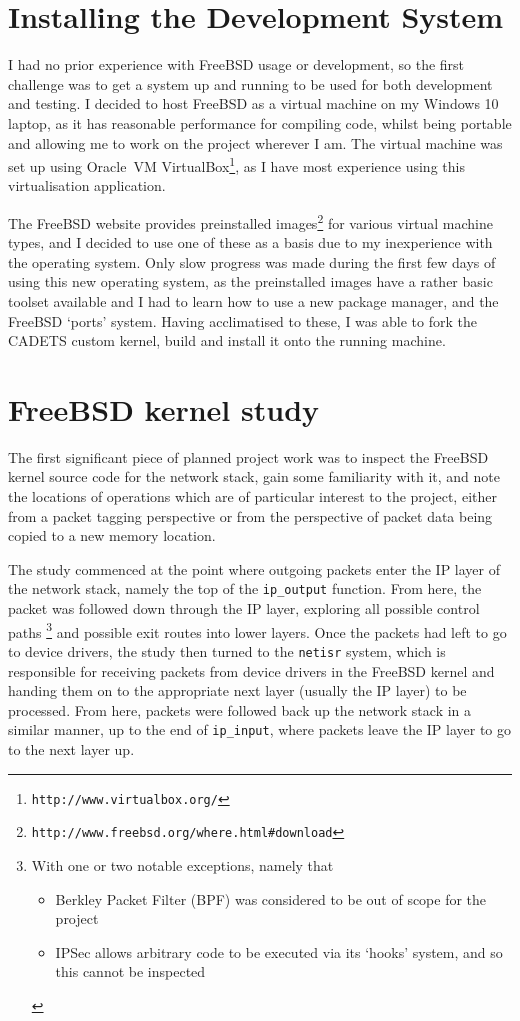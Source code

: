 \documentclass[a4paper,12pt,twoside,openright]{report}
\begin{document}
	\section{Installing the Development System}
	
	I had no prior experience with FreeBSD usage or development, so the first challenge was to get a system up and running to be used for both development and testing. I decided to host FreeBSD as a virtual machine on my Windows 10 laptop, as it has reasonable performance for compiling code, whilst being portable and allowing me to work on the project wherever I am. The virtual machine was set up using Oracle\texttrademark\ VM VirtualBox\footnote{\texttt{http://www.virtualbox.org/}}, as I have most experience using this virtualisation application.
	
	The FreeBSD website provides preinstalled images\footnote{\texttt{http://www.freebsd.org/where.html\#download}} for various virtual machine types, and I decided to use one of these as a basis due to my inexperience with the operating system. Only slow progress was made during the first few days of using this new operating system, as the preinstalled images have a rather basic toolset available and I had to learn how to use a new package manager, and the FreeBSD `ports' system. Having acclimatised to these, I was able to fork the CADETS custom kernel, build and install it onto the running machine.
	
	\section{FreeBSD kernel study}
	
	The first significant piece of planned project work was to inspect the FreeBSD kernel source code for the network stack, gain some familiarity with it, and note the locations of operations which are of particular interest to the project, either from a packet tagging perspective or from the perspective of packet data being copied to a new memory location.
	
	The study commenced at the point where outgoing packets enter the IP layer of the network stack, namely the top of the \verb|ip_output| function. From here, the packet was followed down through the IP layer, exploring all possible control paths
	\footnote{
		With one or two notable exceptions, namely that
		\begin{itemize}
			\item Berkley Packet Filter (BPF) was considered to be out of scope for the project
			\item IPSec allows arbitrary code to be executed via its `hooks' system, and so this cannot be inspected
		\end{itemize}
	}
	and possible exit routes into lower layers. Once the packets had left to go to device drivers, the study then turned to the \texttt{netisr} system, which is responsible for receiving packets from device drivers in the FreeBSD kernel and handing them on to the appropriate next layer (usually the IP layer) to be processed. From here, packets were followed back up the network stack in a similar manner, up to the end of \verb|ip_input|, where packets leave the IP layer to go to the next layer up.
	
\end{document}
